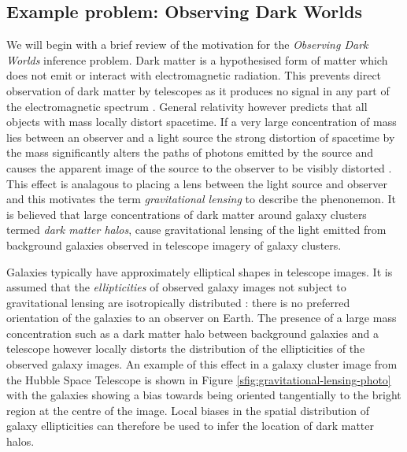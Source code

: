 \subsection{Example problem: Observing Dark Worlds}

We will begin with a brief review of the motivation for the \emph{Observing Dark Worlds} inference problem. Dark matter is a hypothesised form of matter which does not emit or interact with electromagnetic radiation.  This prevents direct observation of dark matter by telescopes as it produces no signal in any part of the electromagnetic spectrum \citep{massey2010dark}. General relativity however predicts that all objects with mass locally distort spacetime. If a very large concentration of mass lies between an observer and a light source the strong distortion of spacetime by the mass significantly alters the paths of photons emitted by the source and causes the apparent image of the source to the observer to be visibly distorted \citep{bartelmann2001weak}. This effect is analagous to placing a lens between the light source and observer and this motivates the term \emph{gravitational lensing} to describe the phenonemon. It is believed that large concentrations of dark matter around galaxy clusters termed \emph{dark matter halos}, cause gravitational lensing of the light emitted from background galaxies observed in telescope imagery of galaxy clusters. %

Galaxies typically have approximately elliptical shapes in telescope images. It is assumed that the \emph{ellipticities} of observed galaxy images not subject to gravitational lensing are isotropically distributed \citep{bartelmann2001weak}: there is no preferred orientation of the galaxies to an observer on Earth. The presence of a large mass concentration such as a dark matter halo between background galaxies and a telescope however locally distorts the distribution of the ellipticities of the observed galaxy images. An example of this effect in a galaxy cluster image from the Hubble Space Telescope is shown in Figure \ref{sfig:gravitational-lensing-photo} with the galaxies showing a bias towards being oriented tangentially to the bright region at the centre of the image. Local biases in the spatial distribution of galaxy ellipticities can therefore be used to infer the location of dark matter halos.

